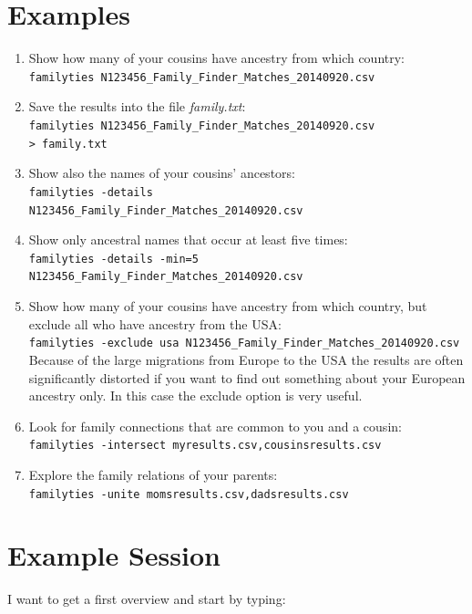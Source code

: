 \documentclass[12pt,a4paper]{article}
\begin{document}
\section{Examples}

\begin{enumerate}
\item Show how many of your cousins have ancestry from which
   country:\\
   \texttt{familyties N123456\_Family\_Finder\_Matches\_20140920.csv}
\item Save the results into the file \emph{family.txt}:\\
   \texttt{familyties N123456\_Family\_Finder\_Matches\_20140920.csv\\ > family.txt}
\item Show also the names of your cousins' ancestors:\\
   \texttt{familyties -details\\ N123456\_Family\_Finder\_Matches\_20140920.csv}
\item Show only ancestral names that occur at least five times:\\
   \texttt{familyties -details -min=5\\ N123456\_Family\_Finder\_Matches\_20140920.csv}
\item Show how many of your cousins have ancestry from which
   country, but exclude all who have ancestry from the USA:\\
   \texttt{familyties -exclude usa N123456\_Family\_Finder\_Matches\_20140920.csv}\\
   Because of the large migrations from Europe to the USA the results
   are often significantly distorted if you want to find out something
   about your European ancestry only. In this case the exclude option
   is very useful.
\item Look for family connections that are common to you and a cousin:\\
   \texttt{familyties -intersect myresults.csv,cousinsresults.csv}
\item Explore the family relations of your parents:\\
   \texttt{familyties -unite momsresults.csv,dadsresults.csv}
\end{enumerate}


\section{Example Session}

I want to get a first overview and start by typing:
\end{document}
